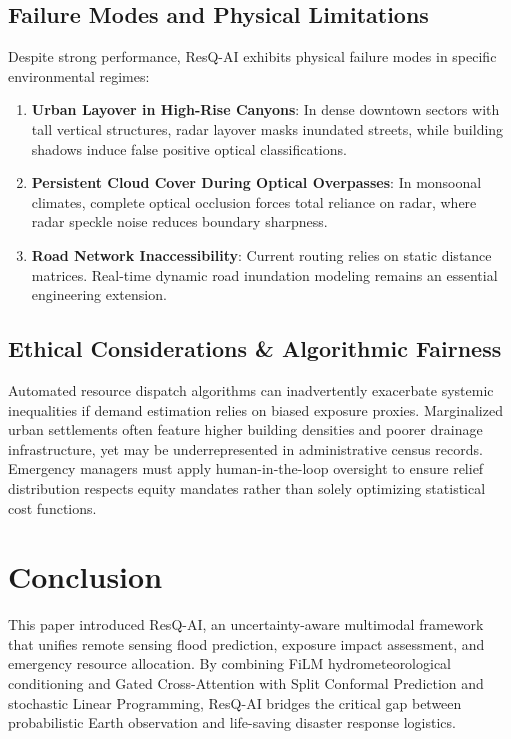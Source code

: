 \documentclass[journal]{IEEEtran}
\begin{document}
\subsection{Failure Modes and Physical Limitations}
Despite strong performance, ResQ-AI exhibits physical failure modes in specific environmental regimes:
\begin{enumerate}
    \item \textbf{Urban Layover in High-Rise Canyons}: In dense downtown sectors with tall vertical structures, radar layover masks inundated streets, while building shadows induce false positive optical classifications.
    \item \textbf{Persistent Cloud Cover During Optical Overpasses}: In monsoonal climates, complete optical occlusion forces total reliance on radar, where radar speckle noise reduces boundary sharpness.
    \item \textbf{Road Network Inaccessibility}: Current routing relies on static distance matrices. Real-time dynamic road inundation modeling remains an essential engineering extension.
\end{enumerate}

\subsection{Ethical Considerations & Algorithmic Fairness}
Automated resource dispatch algorithms can inadvertently exacerbate systemic inequalities if demand estimation relies on biased exposure proxies. Marginalized urban settlements often feature higher building densities and poorer drainage infrastructure, yet may be underrepresented in administrative census records. Emergency managers must apply human-in-the-loop oversight to ensure relief distribution respects equity mandates rather than solely optimizing statistical cost functions.

\section{Conclusion}
\label{sec:conclusion}

This paper introduced ResQ-AI, an uncertainty-aware multimodal framework that unifies remote sensing flood prediction, exposure impact assessment, and emergency resource allocation. By combining FiLM hydrometeorological conditioning and Gated Cross-Attention with Split Conformal Prediction and stochastic Linear Programming, ResQ-AI bridges the critical gap between probabilistic Earth observation and life-saving disaster response logistics.



\end{document}

